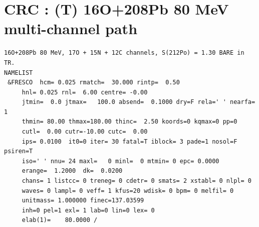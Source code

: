 \documentclass[11pt]{book}
\begin{document}
\section{CRC : (T) 16O+208Pb 80 MeV multi-channel path}
\begin{small} \begin{lstlisting}[frame=single]
16O+208Pb 80 MeV, 17O + 15N + 12C channels, S(212Po) = 1.30 BARE in TR.         
NAMELIST
 &FRESCO  hcm= 0.025 rmatch=  30.000 rintp=  0.50
     hnl= 0.025 rnl=  6.00 centre= -0.00
     jtmin=  0.0 jtmax=   100.0 absend=  0.1000 dry=F rela=' ' nearfa= 1
     thmin= 80.00 thmax=180.00 thinc=  2.50 koords=0 kqmax=0 pp=0
     cutl=  0.00 cutr=-10.00 cutc=  0.00
     ips= 0.0100  it0=0 iter= 30 fatal=T iblock= 3 pade=1 nosol=F psiren=T
     iso=' ' nnu= 24 maxl=   0 minl=  0 mtmin= 0 epc= 0.0000
     erange=  1.2000  dk=  0.0200
     chans= 1 listcc= 0 treneg= 0 cdetr= 0 smats= 2 xstabl= 0 nlpl= 0
     waves= 0 lampl= 0 veff= 1 kfus=20 wdisk= 0 bpm= 0 melfil= 0
     unitmass= 1.000000 finec=137.03599
     inh=0 pel=1 exl= 1 lab=0 lin=0 lex= 0
     elab(1)=    80.0000 /


\end{lstlisting}
\end{small}
\end{document}
